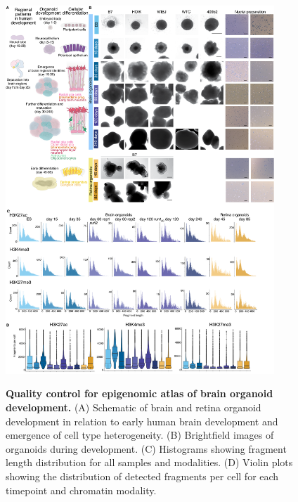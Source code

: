 \begin{figure}[h!]
    \centering
	\includegraphics[width=0.9\textwidth]{figures/cnt/Figure_S1}
    \label{fig:regS1}
    \caption{\textbf{Quality control for epigenomic atlas of brain organoid development.}
    (A) Schematic of brain and retina organoid development in relation to early human brain development and emergence of cell type heterogeneity. (B) Brightfield images of organoids during development. (C) Histograms showing fragment length distribution for all samples and modalities. (D) Violin plots showing the distribution of detected fragments per cell for each timepoint and chromatin modality.}
\end{figure}


